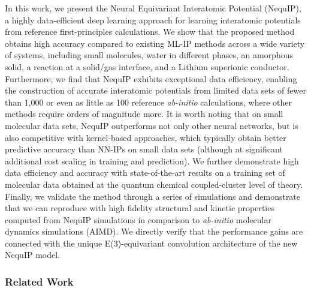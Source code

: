 \documentclass[%
reprint,
superscriptaddress,
nofootinbib,
amsmath,amssymb,
aps,
prl,
]{revtex4-1}
\begin{document}
In this work, we present the Neural Equivariant Interatomic Potential (NequIP), a highly data-efficient deep learning approach for learning interatomic potentials from reference first-principles calculations. We show that the proposed method obtains high accuracy compared to existing ML-IP methods across a wide variety of systems, including small molecules, water in different phases, an amorphous solid, a reaction at a solid/gas interface, and a Lithium superionic conductor. Furthermore, we find that NequIP exhibits exceptional data efficiency, enabling the construction of accurate interatomic potentials from limited data sets of fewer than 1,000 or even as little as 100 reference \textit{ab-initio} calculations, where other methods require orders of magnitude more. It is worth noting that on small molecular data sets, NequIP outperforms not only other neural networks, but is also competitive with kernel-based approaches, which typically obtain better predictive accuracy than NN-IPs on small data sets (although at significant additional cost scaling in training and prediction). We further demonstrate high data efficiency and accuracy with state-of-the-art results on a training set of molecular data obtained at the quantum chemical coupled-cluster level of theory. Finally, we validate the method through a series of simulations and demonstrate that we can reproduce with high fidelity structural and kinetic properties computed from NequIP simulations in comparison to \textit{ab-initio} molecular dynamics simulations (AIMD). We directly verify that the performance gains are connected with the unique E(3)-equivariant convolution architecture of the new NequIP model.\\

\subsubsection{Related Work}
\end{document}
